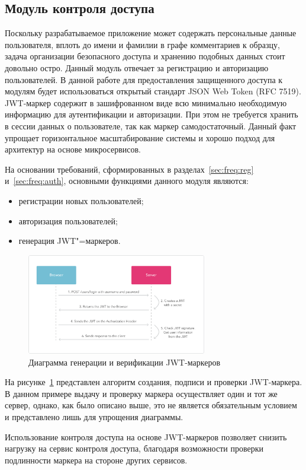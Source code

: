 \subsection{Модуль контроля доступа}
Поскольку разрабатываемое приложение может содержать персональные данные пользователя, вплоть до имени и фамилии в графе комментариев к образцу, задача организации безопасного доступа и хранению подобных данных стоит довольно остро.
Данный модуль отвечает за регистрацию и авторизацию пользователей. 
В данной работе для предоставления защищенного доступа к модулям будет использоваться открытый стандарт JSON Web Token (RFC 7519). JWT-маркер  содержит в зашифрованном виде всю минимально необходимую информацию для аутентификации и авторизации. При этом не требуется хранить в сессии данных о пользователе, так как маркер самодостаточный. Данный факт упрощает горизонтальное масштабирование системы и хорошо подход для архитектур на основе микросервисов.

На основании требований, сформированных в разделах~\ref{sec:freq:reg} и~\ref{sec:freq:auth}, основными функциями данного модуля являются:
\begin{itemize}
  \item регистрации новых пользователей;
  \item авторизация пользователей;
  \item генерация JWT"=маркеров.
\end{itemize}

\begin{figure}[ht]
    \centering
    \includegraphics[width=0.7\textwidth]{figures/jwt_diagram.png}
    \caption{Диаграмма генерации и верификации JWT-маркеров}
    \label{fig:architecture:jwt_diagram}
\end{figure}

На рисунке~\ref{fig:architecture:jwt_diagram} представлен алгоритм создания, подписи и проверки JWT-маркера. В данном примере выдачу и проверку маркера осуществляет один и тот же сервер, однако, как было описано выше, это не является обязательным условием и представлено лишь для упрощения диаграммы.

Использование контроля доступа на основе JWT-маркеров позволяет снизить нагрузку на сервис контроля доступа, благодаря возможности проверки подлинности маркера на стороне других сервисов.